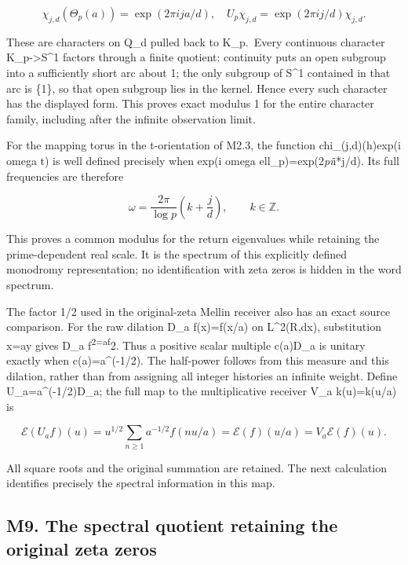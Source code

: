 \[
\chi_{j,d}(\Theta_p(a))=\exp(2\pi i j a/d),
\quad U_p\chi_{j,d}=\exp(2\pi i j/d)\chi_{j,d}.
\tag{M8.1}
\]

These are characters on Q\_d pulled back to K\_p.~Every continuous
character K\_p-\textgreater S\^{}1 factors through a finite quotient:
continuity puts an open subgroup into a sufficiently short arc about 1;
the only subgroup of S\^{}1 contained in that arc is \{1\}, so that open
subgroup lies in the kernel. Hence every such character has the
displayed form. This proves exact modulus 1 for the entire character
family, including after the infinite observation limit.

For the mapping torus in the t-orientation of M2.3, the function
chi\_(j,d)(h)exp(i omega t) is well defined precisely when exp(i omega
ell\_p)=exp(2\emph{pi}i*j/d). Its full frequencies are therefore

\[
\omega=\frac{2\pi}{\log p}\left(k+\frac jd\right),\qquad k\in\mathbb Z.
\tag{M8.2}
\]

This proves a common modulus for the return eigenvalues while retaining
the prime-dependent real scale. It is the spectrum of this explicitly
defined monodromy representation; no identification with zeta zeros is
hidden in the word spectrum.

The factor 1/2 used in the original-zeta Mellin receiver also has an
exact source comparison. For the raw dilation D\_a f(x)=f(x/a) on
L\^{}2(R,dx), substitution x=ay gives \textbar\textbar D\_a
f\textbar\textbar{}\textsuperscript{2=a\textbar\textbar f\textbar\textbar{}}2.
Thus a positive scalar multiple c(a)D\_a is unitary exactly when
c(a)=a\^{}(-1/2). The half-power follows from this measure and this
dilation, rather than from assigning all integer histories an infinite
weight. Define U\_a=a\^{}(-1/2)D\_a; the full map to the multiplicative
receiver V\_a k(u)=k(u/a) is

\[
\mathcal E(U_a f)(u)
=u^{1/2}\sum_{n\ge1}a^{-1/2}f(nu/a)
=\mathcal E(f)(u/a)=V_a\mathcal E(f)(u).
\tag{M8.3}
\]

All square roots and the original summation are retained. The next
calculation identifies precisely the spectral information in this map.

\subsection{M9. The spectral quotient retaining the original zeta
zeros}\label{m9.-the-spectral-quotient-retaining-the-original-zeta-zeros}

